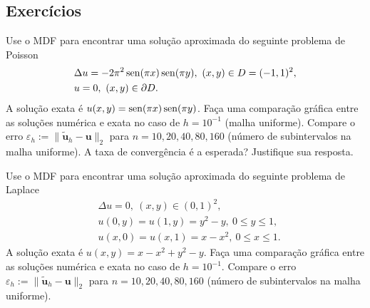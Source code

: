 \subsection{Exercícios}

\begin{exer}
  Use o MDF para encontrar uma solução aproximada do seguinte problema de Poisson
  \begin{subequations}
    \begin{align}
      &\Delta u = -2\pi^2\operatorname{sen}(\pi x)\operatorname{sen}(\pi y),~(x, y)\in D=(-1, 1)^2,\\
      &u = 0, ~(x,y)\in\partial D.
    \end{align}
\end{subequations}
A solução exata é $u(x,y) = \operatorname{sen}(\pi x)\operatorname{sen}(\pi y)$. Faça uma comparação gráfica entre as soluções numérica e exata no caso de $h = 10^{-1}$ (malha uniforme). Compare o erro $\varepsilon_h := \|\tilde{\pmb{u}}_h -\pmb{u}\|_2$ para $n = 10, 20, 40, 80, 160$ (número de subintervalos na malha uniforme). A taxa de convergência é a esperada? Justifique sua resposta.
\end{exer}

\begin{exer}
  Use o MDF para encontrar uma solução aproximada do seguinte problema de Laplace
  \begin{subequations}
    \begin{align}
      &\Delta u = 0,~(x, y)\in (0, 1)^2,\\
      &u(0,y) = u(1,y) = y^2-y, ~0\leq y\leq 1,\\
      &u(x,0) = u(x,1) = x-x^2, ~0\leq x\leq 1.
    \end{align}
\end{subequations}
A solução exata é $u(x,y) = x-x^2 + y^2-y$. Faça uma comparação gráfica entre as soluções numérica e exata no caso de $h = 10^{-1}$. Compare o erro $\varepsilon_h := \|\tilde{\pmb{u}}_h -\pmb{u}\|_2$ para $n = 10, 20, 40, 80, 160$ (número de subintervalos na malha uniforme).
\end{exer}

